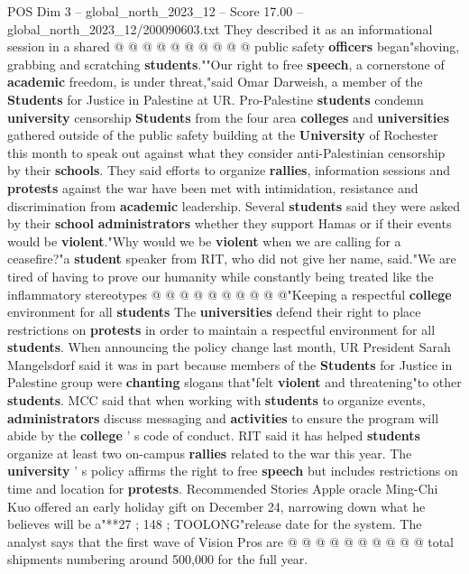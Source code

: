 \begin{textsample}{POS Dim 3 – global\_north\_2023\_12 – Score 17.00 – global\_north\_2023\_12/200090603.txt}
They described it as an informational session in a shared @ @ @ @ @ @ @ @ @ @ public safety \textbf{officers} began"shoving, grabbing and scratching \textbf{students}.""Our right to free \textbf{speech}, a cornerstone of \textbf{academic} freedom, is under threat,"said Omar Darweish, a member of the \textbf{Students} for Justice in Palestine at UR.
Pro-Palestine \textbf{students} condemn \textbf{university} censorship \textbf{Students} from the four area \textbf{colleges} and \textbf{universities} gathered outside of the public safety building at the \textbf{University} of Rochester this month to speak out against what they consider anti-Palestinian censorship by their \textbf{schools}.
They said efforts to organize \textbf{rallies}, information sessions and \textbf{protests} against the war have been met with intimidation, resistance and discrimination from \textbf{academic} leadership.
Several \textbf{students} said they were asked by their \textbf{school} \textbf{administrators} whether they support Hamas or if their events would be \textbf{violent}."Why would we be \textbf{violent} when we are calling for a ceasefire?"a \textbf{student} speaker from RIT, who did not give her name, said."We are tired of having to prove our humanity while constantly being treated like the inflammatory stereotypes @ @ @ @ @ @ @ @ @ @"Keeping a respectful \textbf{college} environment for all \textbf{students} The \textbf{universities} defend their right to place restrictions on \textbf{protests} in order to maintain a respectful environment for all \textbf{students}.
When announcing the policy change last month, UR President Sarah Mangelsdorf said it was in part because members of the \textbf{Students} for Justice in Palestine group were \textbf{chanting} slogans that"felt \textbf{violent} and threatening"to other \textbf{students}.
MCC said that when working with \textbf{students} to organize events, \textbf{administrators} discuss messaging and \textbf{activities} to ensure the program will abide by the \textbf{college} ' s code of conduct.
RIT said it has helped \textbf{students} organize at least two on-campus \textbf{rallies} related to the war this year.
The \textbf{university} ' s policy affirms the right to free \textbf{speech} but includes restrictions on time and location for \textbf{protests}.
Recommended Stories Apple oracle Ming-Chi Kuo offered an early holiday gift on December 24, narrowing down what he believes will be a"**27 ; 148 ; TOOLONG"release date for the system.
The analyst says that the first wave of Vision Pros are @ @ @ @ @ @ @ @ @ @ total shipments numbering around 500,000 for the full year.

\end{textsample}
